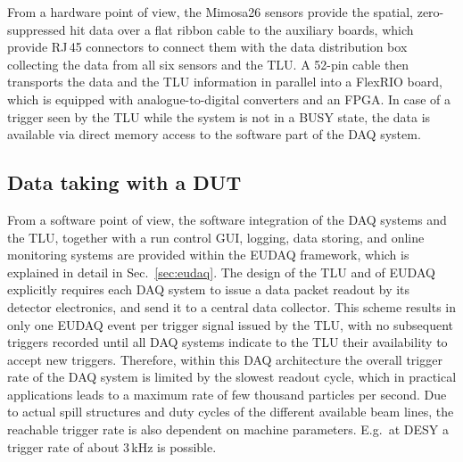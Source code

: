 From a hardware point of view, the Mimosa26 sensors provide the spatial, zero-suppressed hit data over a flat ribbon cable to the auxiliary boards, which provide RJ\,45 connectors to connect them with the
 data distribution box collecting the data from all six sensors and the TLU. 
A 52-pin cable then transports the data and the TLU information in parallel into a FlexRIO board, which is equipped with analogue-to-digital converters and an FPGA. 
In case of a trigger seen by the TLU while the system is not in a BUSY state, the data is available via direct memory access to the software part of the DAQ system. 

\subsection{Data taking with a DUT}

From a software point of view, the software integration of the DAQ systems and the TLU, together with a run control GUI, logging, data storing, and online monitoring systems are provided within the EUDAQ framework,
 which is explained in detail in Sec.~\ref{sec:eudaq}. 
The design of the TLU and of EUDAQ explicitly requires each DAQ system to issue a data packet readout by its detector electronics, and send it to a central data collector. 
This scheme results in only one EUDAQ event per trigger signal issued by the TLU, with no subsequent triggers recorded until all DAQ systems indicate to the TLU their availability to accept new triggers.
Therefore, within this DAQ architecture the overall trigger rate of the DAQ system is limited by the slowest readout cycle,
 which in practical applications leads to a maximum rate of few thousand particles per second. 
Due to actual spill structures and duty cycles of the different available beam lines, the reachable trigger rate is also dependent on machine parameters. 
E.g.~at DESY a trigger rate of about 3\,kHz is possible. 



